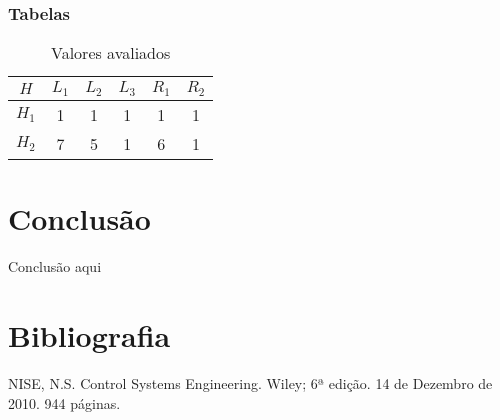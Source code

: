\documentclass[a4paper,12pt]{article}
\begin{document}
\subsubsection{Tabelas}

\begin{table}[H]
    \centering
    \begin{tabular}{cccccc}
        \hline
        $H$ & $L_1$ & $L_2$ & $L_3$ & $R_1$ & $R_2$\\
        \hline
        $H_1$ & 1 & 1 & 1 & 1 & 1\\
        $H_2$ & 7 & 5 & 1 & 6 & 1\\
        \hline
    \end{tabular}
    \caption{Valores avaliados}
    \label{tab:my_label}
\end{table}

\section{Conclusão}
Conclusão aqui


\section{Bibliografia}

NISE, N.S. Control Systems Engineering. Wiley; 6ª edição. 14 de Dezembro de 2010. 944 páginas.

\end{document}

